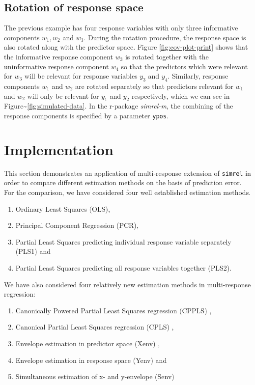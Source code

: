 \documentclass[review]{elsarticle}
\providecommand{\tightlist}{%
  \setlength{\itemsep}{0pt}\setlength{\parskip}{0pt}}
\theoremstyle{definition}
\theoremstyle{definition}
\theoremstyle{definition}
\theoremstyle{remark}
\begin{document}
\hypertarget{rotation-of-response-space}{\subsection{Rotation of
response space}\label{rotation-of-response-space}}

The previous example has four response variables with only three
informative components \(w_1, w_2\) and \(w_3\). During the rotation
procedure, the response space is also rotated along with the predictor
space. Figure \ref{fig:cov-plot-print} shows that the informative
response component \(w_3\) is rotated together with the uninformative
response component \(w_4\) so that the predictors which were relevant
for \(w_3\) will be relevant for response variables \(y_3\) and \(y_4\).
Similarly, response components \(w_1\) and \(w_2\) are rotated
separately so that predictors relevant for \(w_1\) and \(w_2\) will only
be relevant for \(y_1\) and \(y_2\) respectively, which we can see in
Figure\textasciitilde{}\ref{fig:simulated-data}. In the r-package
\emph{simrel-m}, the combining of the response components is specified
by a parameter \texttt{ypos}.

\hypertarget{implementation}{\section{Implementation}\label{implementation}}

This section demonstrates an application of multi-response extension of
\texttt{simrel} in order to compare different estimation methods on the
basis of prediction error. For the comparison, we have considered four
well established estimation methods.

\begin{enumerate}
\def\labelenumi{\alph{enumi})}
\tightlist
\item
  Ordinary Least Squares (OLS),
\item
  Principal Component Regression (PCR),
\item
  Partial Least Squares predicting individual response variable
  separately (PLS1) and
\item
  Partial Least Squares predicting all response variables together
  (PLS2).
\end{enumerate}

We have also considered four relatively new estimation methods in
multi-response regression:

\begin{enumerate}
\def\labelenumi{\alph{enumi})}
\tightlist
\item
  Canonically Powered Partial Least Squares regression (CPPLS)
  \citep{indahl2009canonical},
\item
  Canonical Partial Least Squares regression (CPLS)
  \citep{indahl2009canonical},
\item
  Envelope estimation in predictor space (Xenv)
  \citep{cook2010envelope},
\item
  Envelope estimation in response space (Yenv)
  \citep{cook2015foundations} and
\item
  Simultaneous estimation of x- and y-envelope (Senv)
  \citep{cook2015simultaneous}
\end{enumerate}
\end{document}
